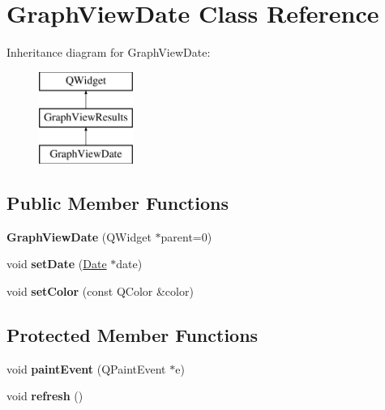 \hypertarget{class_graph_view_date}{\section{Graph\-View\-Date Class Reference}
\label{class_graph_view_date}
}
Inheritance diagram for Graph\-View\-Date\-:\begin{figure}[H]
\begin{center}
\leavevmode
\includegraphics[height=3.000000cm]{class_graph_view_date}
\end{center}
\end{figure}
\subsection*{Public Member Functions}
\begin{DoxyCompactItemize}
\item 
\hypertarget{class_graph_view_date_a5d1833c4f65f3a700a1675fcb23bd5dc}{{\bfseries Graph\-View\-Date} (Q\-Widget $\ast$parent=0)}\label{class_graph_view_date_a5d1833c4f65f3a700a1675fcb23bd5dc}

\item 
\hypertarget{class_graph_view_date_a25db04af8e296a9982a488e42d35992c}{void {\bfseries set\-Date} (\hyperlink{class_date}{Date} $\ast$date)}\label{class_graph_view_date_a25db04af8e296a9982a488e42d35992c}

\item 
\hypertarget{class_graph_view_date_a88e9a5f212822210e9766e8a2aa8d27a}{void {\bfseries set\-Color} (const Q\-Color \&color)}\label{class_graph_view_date_a88e9a5f212822210e9766e8a2aa8d27a}

\end{DoxyCompactItemize}
\subsection*{Protected Member Functions}
\begin{DoxyCompactItemize}
\item 
\hypertarget{class_graph_view_date_ae18998cbf87cefd54314ea8232a856fd}{void {\bfseries paint\-Event} (Q\-Paint\-Event $\ast$e)}\label{class_graph_view_date_ae18998cbf87cefd54314ea8232a856fd}

\item 
\hypertarget{class_graph_view_date_a41d85e6fb3af854f5f528f8776d8f080}{void {\bfseries refresh} ()}\label{class_graph_view_date_a41d85e6fb3af854f5f528f8776d8f080}

\end{DoxyCompactItemize}
